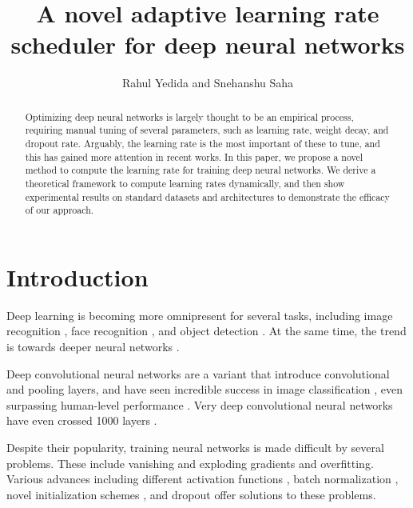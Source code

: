 \documentclass{article}
\title{A novel adaptive learning rate scheduler for deep neural networks}
\author{Rahul Yedida and Snehanshu Saha}
\date{}
\begin{document}
\maketitle

\begin{abstract}
    Optimizing deep neural networks is largely thought to be an empirical process, requiring manual tuning of several parameters, such as learning rate, weight decay, and dropout rate. Arguably, the learning rate is the most important of these to tune, and this has gained more attention in recent works. In this paper, we propose a novel method to compute the learning rate for training deep neural networks. We derive a theoretical framework to compute learning rates dynamically, and then show experimental results on standard datasets and architectures to demonstrate the efficacy of our approach.
\end{abstract}

\section{Introduction}
Deep learning \cite{goodfellow2016deep} is becoming more omnipresent for several tasks, including image recognition \cite{simonyan2014very, szegedy2015going}, face recognition \cite{taigman2014deepface}, and object detection \cite{girshick2014rich}.  At the same time, the trend is towards deeper neural networks \cite{ioffe2015batch,he2015delving}.

Deep convolutional neural networks \cite{krizhevsky2012imagenet,lecun1989backpropagation} are a variant that introduce convolutional and pooling layers, and have seen incredible success in image classification \cite{sermanet2013overfeat,zeiler2014visualizing}, even surpassing human-level performance \cite{he2015delving}. Very deep convolutional neural networks have even crossed 1000 layers \cite{he2016identity}.

Despite their popularity, training neural networks is made difficult by several problems. These include vanishing and exploding gradients \cite{glorot2010understanding,bengio1994learning} and overfitting. Various advances including different activation functions \cite{klambauer2017self,nair2010rectified}, batch normalization \cite{ioffe2015batch}, novel initialization schemes \cite{he2015delving}, and dropout \cite{srivastava2014dropout} offer solutions to these problems. 
\end{document}
